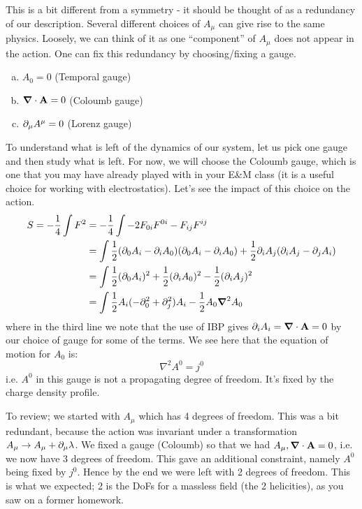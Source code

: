 This is a bit different from a symmetry - it should be thought of as a redundancy of our description. Several different choices of $A_\mu$ can give rise to the same physics. Loosely, we can think of it as one ``component'' of $A_\mu$ does not appear in the action. One can fix this redundancy by choosing/fixing a gauge.
\begin{enumerate}[(a)]
    \item $A_0 = 0$ (Temporal gauge)
    \item $\nabla \cdot \v{A} = 0$ (Coloumb gauge)
    \item $\partial_\mu A^\mu = 0$ (Lorenz gauge)
\end{enumerate}
To understand what is left of the dynamics of our system, let us pick one gauge and then study what is left. For now, we will choose the Coloumb gauge, which is one that you may have already played with in your E\&M class (it is a useful choice for working with electrostatics). Let's see the impact of this choice on the action.
\begin{equation}
    \begin{split}
        S = -\frac{1}{4}\int F^2 &= -\frac{1}{4}\int -2F_{0i}F^{0i} - F_{ij}F^{ij} 
        \\ &= \int \frac{1}{2}(\p_0 A_i - \p_i A_0)(\p_0 A_i - \p_i A_0) + \frac{1}{2}\p_i A_j(\p_i A_j - \p_j A_i)
        \\ &= \int \frac{1}{2}(\p_0 A_i)^2 + \frac{1}{2}(\p_i A_0)^2 - \frac{1}{2}(\p_i A_j)^2
        \\ &= \int \frac{1}{2}A_i(-\p_0^2 + \p_j^2)A_i - \frac{1}{2}A_0\nabla^2 A_0
    \end{split}
\end{equation}
where in the third line we note that the use of IBP gives $\p_i A_i = \nabla \cdot \v{A} = 0$ by our choice of gauge for some of the terms. We see here that the equation of motion for $A_0$ is:
\begin{equation}
    \nabla^2 A^0 = j^0
\end{equation}
i.e. $A^0$ in this gauge is not a propagating degree of freedom. It's fixed by the charge density profile.

To review; we started with $A_\mu$ which has 4 degrees of freedom. This was a bit redundant, because the action was invariant under a transformation $A_\mu \to A_\mu + \partial_\mu \lambda$. We fixed a gauge (Coloumb) so that we had $A_\mu, \nabla \cdot \v{A} = 0$, i.e. we now have 3 degrees of freedom. This gave an additional constraint, namely $A^0$ being fixed by $j^0$. Hence by the end we were left with 2 degrees of freedom. This is what we expected; 2 is the DoFs for a massless field (the 2 helicities), as you saw on a former homework.


